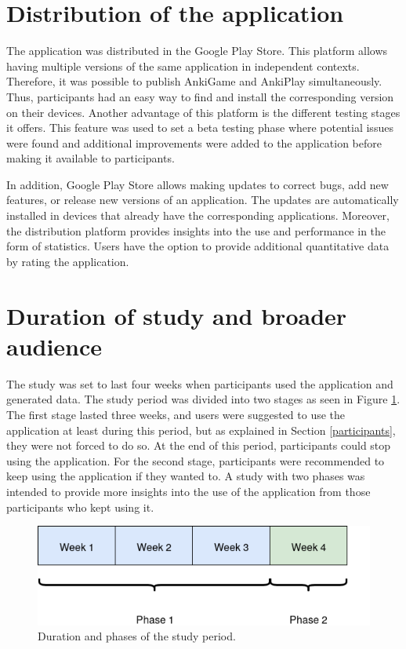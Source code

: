 \section{Distribution of the application}
The application was distributed in the Google Play Store. This platform allows having multiple versions of the same application in independent contexts. Therefore, it was possible to publish AnkiGame and AnkiPlay simultaneously. Thus, participants had an easy way to find and install the corresponding version on their devices. Another advantage of this platform is the different testing stages it offers. This feature was used to set a beta testing phase where potential issues were found and additional improvements were added to the application before making it available to participants.

In addition, Google Play Store allows making updates to correct bugs, add new features, or release new versions of an application. The updates are automatically installed in devices that already have the corresponding applications. Moreover, the distribution platform provides insights into the use and performance in the form of statistics. Users have the option to provide additional quantitative data by rating the application.

\section{Duration of study and broader audience}
The study was set to last four weeks when participants used the application and generated data. The study period was divided into two stages as seen in Figure \ref{fig:study-period}. The first stage lasted three weeks, and users were suggested to use the application at least during this period, but as explained in Section \ref{participants}, they were not forced to do so. At the end of this period, participants could stop using the application. For the second stage, participants were recommended to keep using the application if they wanted to. A study with two phases was intended to provide more insights into the use of the application from those participants who kept using it.

\begin{figure}[htb]
    \vskip 5mm
        \begin{center}
            \includegraphics[scale=0.7]{./Figures/study_period.png}
            \caption{Duration and phases of the study period.}
            \label{fig:study-period}
        \end{center}
    \vskip -5mm
\end{figure}

